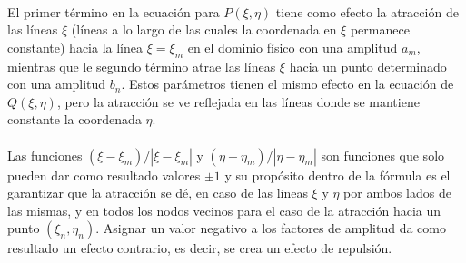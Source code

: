 \documentclass[letterpaper, openright, 12pt]{book}
\begin{document}
    \paragraph*{}
        El primer término en la ecuación para $P(\xi, \eta)$ tiene como efecto
        la atracción de las líneas $\xi$ (líneas a lo largo de las cuales la
        coordenada en $\xi$ permanece constante) hacia la línea $\xi = \xi_{m}$
        en el dominio físico con una amplitud $a_{m}$, mientras que le segundo
        término atrae las líneas $\xi$ hacia un punto determinado con una
        amplitud $b_{n}$. Estos parámetros tienen el mismo efecto en la ecuación
        de $Q(\xi, \eta)$, pero la atracción se ve reflejada en las líneas donde
        se mantiene constante la coordenada $\eta$.
    \paragraph*{}
        Las funciones $(\xi - \xi_{m}) / |\xi - \xi_{m}|$ y $(\eta - \eta_{m}) / |\eta - \eta_{m}|$
        son funciones que solo pueden dar como resultado valores $\pm 1$ y su
        propósito dentro de la fórmula es el garantizar que la atracción se dé,
        en caso de las lineas $\xi$ y $\eta$ por ambos lados de las mismas, y en
        todos los nodos vecinos para el caso de la atracción hacia un punto
        $(\xi_{n}, \eta_{n})$. Asignar un valor negativo a los factores de
        amplitud da como resultado un efecto contrario, es decir, se crea un
        efecto de repulsión.
\end{document}
